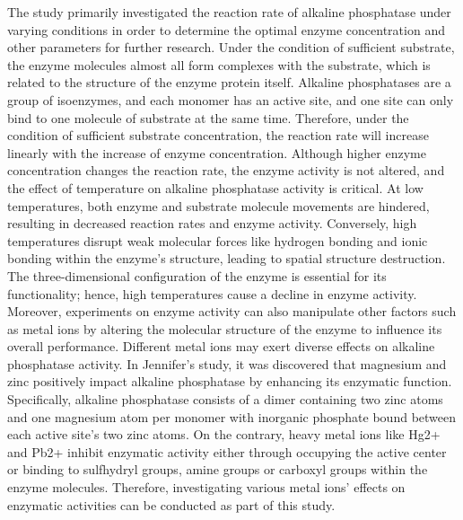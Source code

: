 \documentclass[a4paper,10pt]{article}
\begin{document}
\begin{multicols}{2}
The study primarily investigated the reaction rate of alkaline phosphatase under varying conditions in order to determine the optimal enzyme concentration and other parameters for further research. Under the condition of sufficient substrate, the enzyme molecules almost all form complexes with the substrate, which is related to the structure of the enzyme protein itself. Alkaline phosphatases are a group of isoenzymes, and each monomer has an active site, and one site can only bind to one molecule of substrate at the same time. Therefore, under the condition of sufficient substrate concentration, the reaction rate will increase linearly with the increase of enzyme concentration. Although higher enzyme concentration changes the reaction rate, the enzyme activity is not altered, and the effect of temperature on alkaline phosphatase activity is critical. At low temperatures, both enzyme and substrate molecule movements are hindered, resulting in decreased reaction rates and enzyme activity\cite{dede2002effect}. Conversely, high temperatures disrupt weak molecular forces like hydrogen bonding and ionic bonding within the enzyme's structure, leading to spatial structure destruction. The three-dimensional configuration of the enzyme is essential for its functionality; hence, high temperatures cause a decline in enzyme activity\cite{bzura2018photometric}. Moreover, experiments on enzyme activity can also manipulate other factors such as metal ions by altering the molecular structure of the enzyme to influence its overall performance. Different metal ions may exert diverse effects on alkaline phosphatase activity. In Jennifer's study, it was discovered that magnesium and zinc positively impact alkaline phosphatase by enhancing its enzymatic function. Specifically, alkaline phosphatase consists of a dimer containing two zinc atoms and one magnesium atom per monomer with inorganic phosphate bound between each active site's two zinc atoms\cite{murphy1995mutations}. On the contrary, heavy metal ions like Hg2+ and Pb2+ inhibit enzymatic activity either through occupying the active center or binding to sulfhydryl groups, amine groups or carboxyl groups within the enzyme molecules. Therefore, investigating various metal ions' effects on enzymatic activities can be conducted as part of this study.


\end{multicols}
\end{document}
